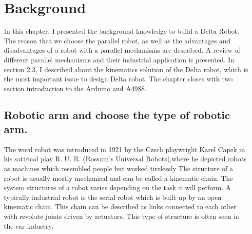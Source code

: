 \makeatletter
\def\maxwidth#1{\ifdim\Gin@nat@width>#1 #1\else\Gin@nat@width\fi}
\makeatother

\chapter{Background}

In this chapter, I presented the background knowledge to build a Delta Robot. The reason that we choose the parallel robot, as well as the advantages and disadvantages of a robot with a parallel mechanisms are described. A review of different parallel mechanisms and their industrial application is presented. 
In section 2.3, I described about the kinematics solution of the Delta robot, which is the most important issue to design Delta robot.
The chapter closes with two section introduction to the Arduino and A4988.

\section{Robotic arm and choose the type of robotic arm.}

The word robot was introduced in 1921 by the Czech playwright Karel Capek in his satirical play R. U. R. (Rossum’s Universal Robots),where he depicted robots as machines which resembled people but worked tirelessly The structure of a robot is usually mostly mechanical and can be called a kinematic chain. The system structures of a robot varies depending on the task it will perform. A typically industrial robot is the serial robot which is built up by an open kinematic chain. This chain can be described as links connected to each other with revolute joints driven by actuators. This type of structure is often seen in the car industry.

